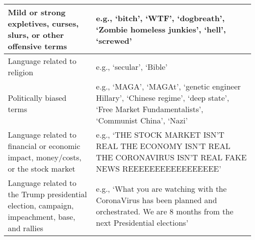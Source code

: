 \documentclass{article}
\begin{document}
\begin{table}[htp]
\begin{tabular}{p{6cm}|p{9cm}}
    \hline
    Mild or strong expletives, curses, slurs, or other offensive terms & e.g., ‘bitch’, ‘WTF’, ‘dogbreath’, ‘Zombie homeless junkies’, ‘hell’, ‘screwed’ \\
    \hline
    Language related to religion & e.g., ‘secular’, ‘Bible’ \\
     \hline
    Politically biased terms & e.g., ‘MAGA’, ‘MAGAt’, ‘genetic engineer Hillary’, ‘Chinese regime’, ‘deep state’, ‘Free Market Fundamentalists’, ‘Communist China’, ‘Nazi’ \\
    \hline
    Language related to financial or economic impact, money/costs, or the stock market & e.g., ‘THE STOCK MARKET ISN’T REAL THE ECONOMY ISN’T REAL THE CORONAVIRUS ISN’T REAL FAKE NEWS REEEEEEEEEEEEEEEEE’ \\
    \hline
    Language related to the Trump presidential election, campaign, impeachment, base, and rallies & e.g., ‘What you are watching with the CoronaVirus has been planned and orchestrated. We are 8 months from the next Presidential elections’ \\
    \hline
  \end{tabular}
  \label{tab:table1words}
\end{table}



\end{document}
